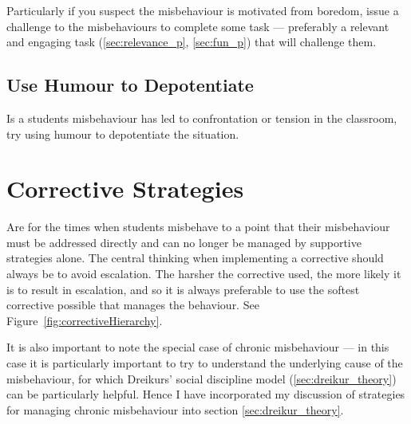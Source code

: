 \documentclass[12pt]{report}
\begin{document}
Particularly if you suspect the misbehaviour is motivated from boredom, issue a challenge to the misbehaviours to complete some task --- preferably a relevant and engaging task (\ref{sec:relevance_p}, \ref{sec:fun_p}) that will challenge them. 



\section{Use Humour to Depotentiate}
\label{sec:humour_s}

Is a students misbehaviour has led to confrontation or tension in the classroom, try using humour to depotentiate the situation.

























\chapter{Corrective Strategies}
\label{chap:corrective}

Are for the times when students misbehave to a point that their misbehaviour must be addressed directly and can no longer be managed by supportive strategies alone. The central thinking when implementing a corrective should always be to avoid escalation. The harsher the corrective used, the more likely it is to result in escalation, and so it is always preferable to use the softest corrective possible that manages the behaviour. See Figure~\ref{fig:correctiveHierarchy}.

It is also important to note the special case of chronic misbehaviour --- in this case it is particularly important to try to understand the underlying cause of the misbehaviour, for which Dreikurs' social discipline model (\ref{sec:dreikur_theory}) can be particularly helpful. Hence I have incorporated my discussion of strategies for managing chronic misbehaviour into section \ref{sec:dreikur_theory}.
\end{document}
